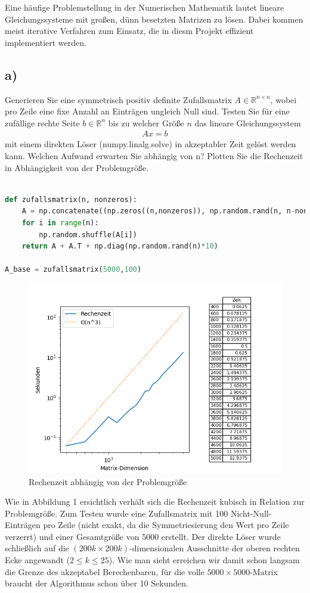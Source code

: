 Eine häufige Problemstellung in der Numerischen Mathematik lautet lineare Gleichungssysteme mit großen, dünn besetzten Matrizen zu lösen.
Dabei kommen meist iterative Verfahren zum Einsatz, die in diesm Projekt effizient implementiert werden.
\subsection*{a)}
Generieren Sie eine symmetrisch positiv definite Zufallsmatrix $A \in \mathbb{R}^{n\times n}$, wobei pro Zeile eine fixe Anzahl an Einträgen
ungleich Null sind. Testen Sie für eine zufällige rechte Seite $b \in \mathbb{R}^n$ bis zu welcher Größe $n$ das lineare
Gleichungssystem
\begin{align*}
  Ax = b
\end{align*}
mit einem direkten Löser (numpy.linalg.solve) in akzeptabler Zeit gelöst werden kann.
Welchen Aufwand erwarten Sie abhängig von n? Plotten Sie die Rechenzeit in Abhängigkeit von der Problemgröße.
\begin{lstlisting}[language=Python]

def zufallsmatrix(n, nonzeros):
	A = np.concatenate((np.zeros((n,nonzeros)), np.random.rand(n, n-nonzeros)), axis = 1)
	for i in range(n):
		np.random.shuffle(A[i])
	return A + A.T + np.diag(np.random.rand(n)*10)

A_base = zufallsmatrix(5000,100)
\end{lstlisting}
\begin{figure}
    \centering
    \includegraphics[width=\linewidth]{Aufgabe_1/plot_a.png}
    \caption{Rechenzeit abhängig von der Problemgröße}
    \label{fig:my_label}
\end{figure}
Wie in Abbildung 1 ersichtlich verhält sich die Rechenzeit kubisch in Relation zur Problemgröße.
Zum Testen wurde eine Zufallsmatrix mit 100 Nicht-Null-Einträgen pro Zeile (nicht exakt, da die Symmetriesierung den Wert pro
Zeile verzerrt) und einer Gesamtgröße von 5000 erstellt. Der direkte Löser wurde schließlich auf die $(200k \times 200k)$-dimensionalen Ausschnitte der oberen rechten Ecke angewandt ($2 \leq k \leq 25$). Wie man sieht erreichen wir damit schon langsam die Grenze
des akzeptabel Berechenbaren, für die volle $5000\times5000$-Matrix braucht der Algorithmus schon über 10 Sekunden.
\FloatBarrier
